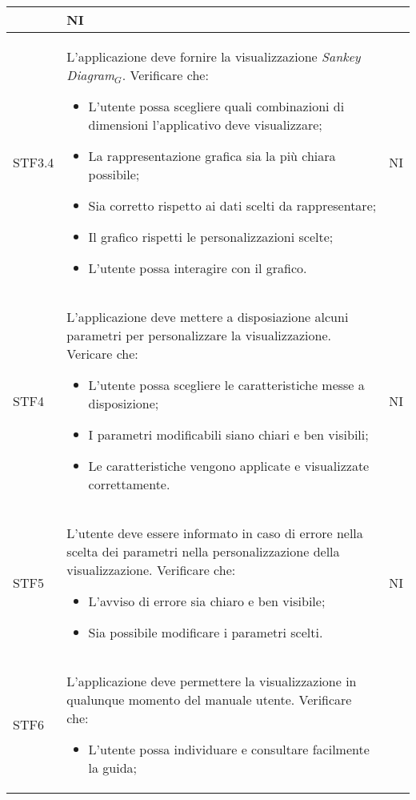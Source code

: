 \begin{center}
\begin{longtable}{|p{1.5cm}|p{11cm}|p{1cm}|}
\begin{itemize}
        \end{itemize} & NI\\ \hline
        \rowcolor[HTML]{EFEFEF}
        STF3.4 & L'applicazione deve fornire la visualizzazione  \textit{Sankey Diagram}$_G$. Verificare che: \begin{itemize}
            \item L'utente possa scegliere quali combinazioni di dimensioni l'applicativo deve visualizzare;
            \item La rappresentazione grafica sia la più chiara possibile;
            \item Sia corretto rispetto ai dati scelti da rappresentare;
            \item Il grafico rispetti le personalizzazioni scelte;
            \item L'utente possa interagire con il grafico.
        \end{itemize} & NI\\ \hline
        \rowcolor[HTML]{C0C0C0}
        STF4 & L'applicazione deve mettere a disposiazione alcuni parametri per personalizzare la visualizzazione. Vericare che: \begin{itemize}
            \item L'utente possa scegliere le caratteristiche messe a disposizione;
            \item I parametri modificabili siano chiari e ben visibili;
            \item Le caratteristiche vengono applicate e visualizzate correttamente.
        \end{itemize} & NI\\ \hline
        \rowcolor[HTML]{EFEFEF}
        STF5 & L'utente deve essere informato in caso di errore nella scelta dei parametri nella personalizzazione della visualizzazione. Verificare che: \begin{itemize}
            \item L'avviso di errore sia chiaro e ben visibile;
            \item Sia possibile modificare i parametri scelti.
        \end{itemize} & NI\\ \hline
        \rowcolor[HTML]{C0C0C0}
        STF6 & L'applicazione deve permettere la visualizzazione in qualunque momento del manuale utente. Verificare che: \begin{itemize}
            \item L'utente possa individuare e consultare facilmente la guida;

\end{itemize}
\end{longtable}
\end{center}
